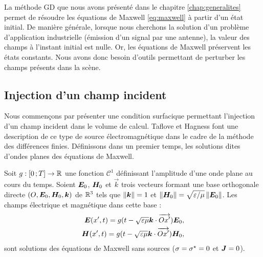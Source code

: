 La méthode GD que nous avons présenté dans le chapitre \ref{chap:generalites} permet de résoudre les équations de Maxwell
\eqref{eq:maxwell} à partir d'un état initial.
De manière générale, lorsque nous cherchons la solution d'un problème
d'application industrielle (émission d'un signal par une antenne),
la valeur des champs à l'instant initial est nulle.
Or, les équations de Maxwell préservent les états constants.
Nous avons donc besoin d'outils permettant de perturber les champs
présents dans la scène.
\\

\subsection{Injection d’un champ incident}
\label{ssect:huygens}

Nous commençons par présenter une condition surfacique permettant
l’injection d’un champ incident dans le volume de calcul.
Taflove et Hagness \cite{taflove2005computational} font une description
de ce type de source électromagnétique dans le cadre
de la méthode des différences finies.
Définissons dans un premier temps, les solutions dites d’ondes planes des
équations de Maxwell.

\begin{proposition} \label{prop:onde_plane}
	Soit $g:\lbrack0\,;T\rbrack\rightarrow\mathbb{R}$ une fonction $\mathcal{C}^1$
	définissant l’amplitude d’une onde plane au cours du temps.
	Soient $\bm{E}_0$, $\bm{H}_0$ et $\Vec{k}$ trois vecteurs formant
	une base orthogonale directe $(O, \bm{E}_0, \bm{H}_0, \bm{k})$
	de $\mathbb{R}^{3}$ tels que $\left\Vert\bm{k}\right\Vert = 1$
	et $\left\Vert\bm{H}_0\right\Vert = \sqrt{\varepsilon / \mu} \left\Vert\bm{E}_0\right\Vert$.
	Les champs électrique et magnétique dans cette base :
	\begin{subequations}
		\begin{align}
		\bm{E} (x', t) = g(t - \sqrt{\varepsilon\mu} \bm{k} \cdot \overrightarrow{Ox'}) \bm{E}_0 ,
		\\
		\bm{H} (x', t) = g(t - \sqrt{\varepsilon\mu} \bm{k} \cdot \overrightarrow{Ox'}) \bm{H}_0 ,
		\end{align}
	\end{subequations}
	sont solutions des équations de Maxwell sans sources
	($\sigma = \sigma^\star = 0$ et $\bm{J} = 0$).
\end{proposition}

